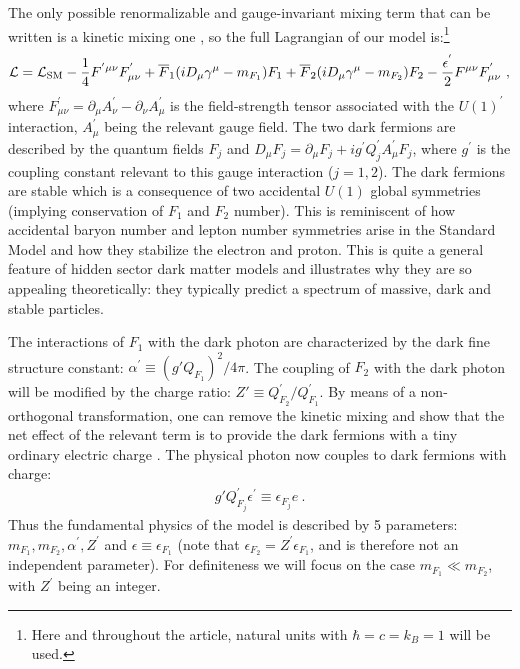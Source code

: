 \documentclass[12pt]{article}
\begin{document}
The only possible renormalizable and gauge-invariant mixing term that can be written is a kinetic mixing one \cite{foothe}, so the full Lagrangian of our model is:\footnote{Here and throughout the article, natural units with $\hbar = c = k _B = 1$ will be used.}
%
\begin{eqnarray}
{\cal L} = {\cal L} _{\text{SM}} -\frac{1}{4}F ^{'\mu \nu} F _{\mu \nu} ^{'} + \overline{F} _1(iD _{\mu}\gamma ^{\mu} - m _{F_1})F _1 + \overline{F} _2(iD _{\mu}\gamma ^{\mu} - m _{F_2})F _2 - \frac{\epsilon ^{'}}{2}F ^{\mu \nu} F _{\mu \nu} ^{'} \ ,
\end{eqnarray}
%
where $F _{\mu \nu} ^{'} = \partial _{\mu} A _{\nu} ^{'} - \partial _{\nu} A _{\mu} ^{'}$ is the field-strength tensor associated with the $U(1) ^{'}$ interaction, $A _{\mu} ^{'}$ being the relevant gauge field. The two dark fermions are described by the quantum fields $F_j$ and $D _{\mu}F _j = \partial _{\mu}F _j + ig ^{'}Q _{j} ^{'} A _{\mu} ^{'}F _j$, where $g ^{'}$ is the coupling constant relevant to this gauge interaction ($j=1,2$). The dark fermions are stable which is a consequence of two accidental $U(1)$ global symmetries (implying conservation of $F_1$ and $F_2$ number). This is reminiscent of how accidental baryon number and lepton number symmetries arise in the Standard Model and how they stabilize the electron and proton. This is quite a general feature of hidden sector dark matter models and illustrates why they are so appealing theoretically: they typically predict a spectrum of massive, dark and stable particles.

The interactions of $F _1$ with the dark photon are characterized by the dark fine structure constant: $\alpha ^{'} \equiv (g'Q _{F_1}) ^2/4\pi$. The coupling of $F _2$ with the dark photon will be modified by the charge ratio: $Z' \equiv Q _{F_2} ^{'}/Q _{F_1} ^{'}$. By means of a non-orthogonal transformation, one can remove the kinetic mixing and show that the net effect of the relevant term is to provide the dark fermions with a tiny ordinary electric charge \cite{holdom}. The physical photon now couples to dark fermions with charge:
%
\begin{eqnarray}
g'Q _{F_j} ^{'} \epsilon ^{'} \equiv \epsilon _{F_j}e \ .
\end{eqnarray}
%
Thus the fundamental physics of the model is described by 5 parameters: $m _{F_1},m _{F_2},\alpha ^{'},Z ^{'}$ and $\epsilon \equiv \epsilon _{F_1}$ (note that $\epsilon _{F_2} = Z ^{'}\epsilon _{F_1}$, and is therefore not an independent parameter). For definiteness we will focus on the case $m _{F_1} \ll m _{F_2}$, with $Z ^{'}$ being an integer.
\end{document}
